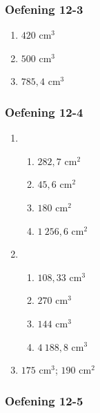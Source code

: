 {\begin{multicols}{3}
\subsubsection*{Oefening 12-3} %

\begin{enumerate}[noitemsep, label=\textbf{\arabic*}. ] 
\item $420$ cm$^3$
\item $500$ cm$^3$
\item $785,4$ cm$^3$
\end{enumerate}

\subsubsection*{Oefening 12-4} %

\begin{enumerate}[noitemsep, label=\textbf{\arabic*}. ] 
\item %
    \begin{enumerate}[noitemsep, label=\textbf{\alph*}. ]
	  \item $282,7$ cm$^2$
\item  $45,6$ cm$^2$
	  \item $180$ cm$^2$
	  
	  \item $1~256,6$ cm$^2$
    \end{enumerate}
\item %
    \begin{enumerate}[noitemsep, label=\textbf{\alph*}. ]
	  \item $108,33$ cm$^3$
	  \item $270$ cm$^3$
	  \item  $144$ cm$^3$
	  \item $4~188,8$ cm$^3$
    \end{enumerate}
\item %
 $175$ cm$^3$; $190$ cm$^2$
    \end{enumerate}


\subsubsection*{Oefening 12-5} %


\end{multicols}}

